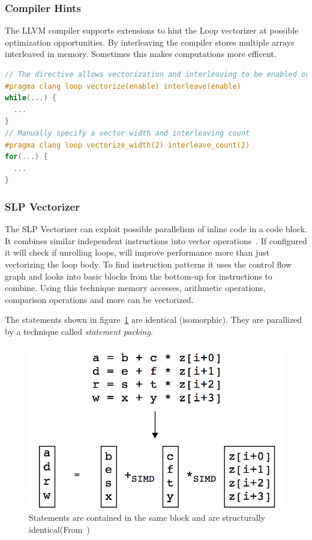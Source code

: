 \subsubsection{Compiler Hints}

The LLVM compiler supports extensions to hint the Loop vectorizer at possible
optimization opportunities. By interleaving the compiler stores multiple arrays interleaved in memory.
Sometimes this makes computations more efficent.
\begin{lstlisting}[language=C]
// The directive allows vectorization and interleaving to be enabled or disabled.
#pragma clang loop vectorize(enable) interleave(enable)
while(...) {
  ...
}
// Manually specify a vector width and interleaving count
#pragma clang loop vectorize_width(2) interleave_count(2)
for(...) {
  ...
}
\end{lstlisting}

\subsubsection{SLP Vectorizer}

The SLP Vectorizer can exploit possible parallelism of inline code in a code block. It combines
similar independent instructions into vector operations~\cite{conf/pldi/LiuZJDK12}. If configured it will check if unrolling
loops, will improve performance more than just vectorizing the loop body.
To find instruction patterns it uses the control flow graph and looks into basic blocks from the bottom-up 
for instructions to combine. Using this technique memory accesses, arithmetic operations, 
comparison operations and more can be vectorized.

The statements shown in figure~\ref{fig:slp_example} are identical (isomorphic).
They are parallized by a technique called \textit{statement packing}. 
\begin{figure}[H]
  \centering
    \includegraphics[width=.5\textwidth]{../slides/pictures/slp_example}
    \caption{Statements are contained in the same block and are structurally 
    identical(From~\cite{conf/pldi/LarsenA00})}\label{fig:slp_example}
\end{figure}
